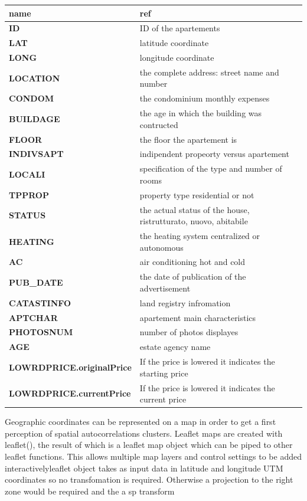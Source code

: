 \documentclass[
  12pt,
  a4paper,
  oneside]{book}
\begin{document}
\begin{longtable}[t]{>{}l>{\raggedright\arraybackslash}p{20em}}
\toprule
name & ref\\
\midrule
\textbf{ID} & ID of the apartements\\
\textbf{LAT} & latitude coordinate\\
\textbf{LONG} & longitude coordinate\\
\textbf{LOCATION} & the complete address: street name and number\\
\textbf{CONDOM} & the condominium monthly expenses\\
\addlinespace
\textbf{BUILDAGE} & the age in which the building was contructed\\
\textbf{FLOOR} & the floor the apartement is\\
\textbf{INDIVSAPT} & indipendent propeorty versus apartement\\
\textbf{LOCALI} & specification of the type and number of rooms\\
\textbf{TPPROP} & property type residential or not\\
\addlinespace
\textbf{STATUS} & the actual status of the house, ristrutturato, nuovo, abitabile\\
\textbf{HEATING} & the heating system centralized or autonomous\\
\textbf{AC} & air conditioning hot and cold\\
\textbf{PUB\_DATE} & the date of publication of the advertisement\\
\textbf{CATASTINFO} & land registry infromation\\
\addlinespace
\textbf{APTCHAR} & apartement main characteristics\\
\textbf{PHOTOSNUM} & number of photos displayes\\
\textbf{AGE} & estate agency name\\
\textbf{LOWRDPRICE.originalPrice} & If the price is lowered it indicates the starting price\\
\textbf{LOWRDPRICE.currentPrice} & If the price is lowered it indicates the current price\\
\bottomrule
\end{longtable}
\endgroup{}

Geographic coordinates can be represented on a map in order to get a first perception of spatial autocorrelations clusters.
Leaflet maps are created with leaflet(), the result of which is a leaflet map object which can be piped to other leaflet functions. This allows multiple map layers and control settings to be added interactivelyleaflet object takes as input data in latitude and longitude UTM coordinates so no transfomation is required. Otherwise a projection to the right zone would be required and the a sp transform
\end{document}
